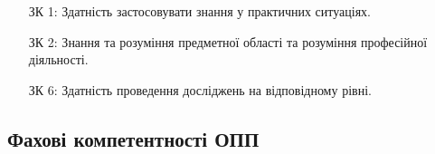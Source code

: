 \documentclass{Syllabus}
\begin{document}
\begin{enumerate}
\item [ЗК 1:] Здатність застосовувати знання у практичних ситуаціях.
\item [ЗК 2:] Знання та розуміння предметної області та розуміння професійної діяльності.
\item [ЗК 6:] Здатність проведення досліджень на відповідному рівні.
\end{enumerate}

\subsection*{Фахові компетентності ОПП}
\end{document}
